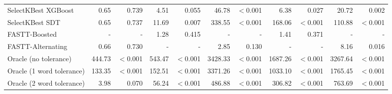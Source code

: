 \begin{table}[t]
\begin{adjustbox}{max width=\linewidth}
\begin{tabular}{lrrrrrrrrrr}
        SelectKBest XGBoost & 0.65 & 0.739 & 4.51 & 0.055 & 46.78 & $<$0.001 & 6.38 & 0.027 & 20.72 & 0.002 \\
        SelectKBest SDT & 0.65 & 0.737 & 11.69 & 0.007 & 338.55 & $<$0.001 & 168.06 & $<$0.001 & 110.88 & $<$0.001 \\
        \midrule
        FASTT-Boosted & - & - & 1.28 & 0.415 & - & - & 1.41 & 0.371 & - & - \\
        FASTT-Alternating & 0.66 & 0.730 & - & - & 2.85 & 0.130 & - & - & 8.16 & 0.016 \\
        \midrule
        Oracle (no tolerance) & 444.73 & $<$0.001 & 543.47 & $<$0.001 & 3428.33 & $<$0.001 & 1687.26 & $<$0.001 & 3267.64 & $<$0.001 \\
        Oracle (1 word tolerance) & 133.35 & $<$0.001 & 152.51 & $<$0.001 & 3371.26 & $<$0.001 & 1033.10 & $<$0.001 & 1765.45 & $<$0.001 \\
        Oracle (2 word tolerance) & 3.98 & 0.070 & 56.24 & $<$0.001 & 486.88 & $<$0.001 & 306.82 & $<$0.001 & 763.69 & $<$0.001 \\
        \bottomrule
    \end{tabular}
    \end{adjustbox}
\end{table}

